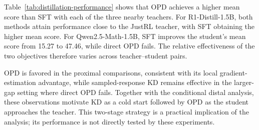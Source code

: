 Table~\ref{tab:distillation-performance} shows that OPD achieves a
higher mean score than SFT with each of the three nearby teachers.
For R1-Distill-1.5B, both methods attain performance close to the
JustRL teacher, with SFT obtaining the higher mean score. For
Qwen2.5-Math-1.5B, SFT improves the student's mean score from 15.27
to 47.46, while direct OPD fails. The relative effectiveness of the
two objectives therefore varies across teacher--student pairs.

\begin{takeaway}
OPD is favored in the proximal comparisons, consistent with its
local gradient-estimation advantage, while sampled-response KD remains
effective in the larger-gap setting where direct OPD fails. Together
with the conditional distal analysis, these observations motivate KD
as a cold start followed by OPD as the student approaches the teacher.
This two-stage strategy is a practical implication of the analysis;
its performance is not directly tested by these experiments.
\end{takeaway}
\FloatBarrier
